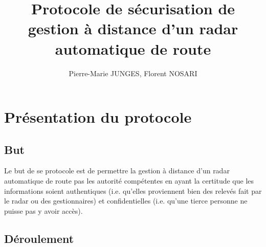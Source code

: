 \documentclass[]{scrartcl}
\title{Protocole de sécurisation de gestion à distance d'un radar automatique de route}
\author{Pierre-Marie JUNGES, Florent NOSARI}
\begin{document}
\maketitle

\begin{abstract}

\end{abstract}

\section{Présentation du protocole}

\subsection{But}

Le but de se protocole est de permettre la gestion à distance d'un radar automatique de route pas les autorité compétentes en ayant la certitude que les informations soient authentiques (i.e. qu'elles proviennent bien des relevés fait par le radar ou des gestionnaires) et confidentielles (i.e. qu'une tierce personne ne puisse pas y avoir accès).

\subsection{Déroulement}
\end{document}
